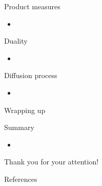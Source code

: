 \documentclass[9pt]{beamer}
\begin{document}
\begin{frame}{Product measures}
\begin{itemize}
    \item
\end{itemize}
\end{frame}


\begin{frame}{Duality}
\begin{theorem}
\end{theorem}
\begin{itemize}
    \item
\end{itemize}
\end{frame}


\begin{frame}{Diffusion process}
\begin{itemize}
    \item 
\end{itemize}
\end{frame}




\begin{frame}{Wrapping up}
  \begin{block}{Summary}
    \begin{itemize}
    \item 
    \end{itemize}
  \end{block}
  \pause
  \begin{center}
  \vspace{5em}
  \huge{
  Thank you for your attention!
  }
  \end{center}
\end{frame}

\begin{frame}[allowframebreaks]{References}

%   
%   
  \printbibliography
\end{frame}
\end{document}
